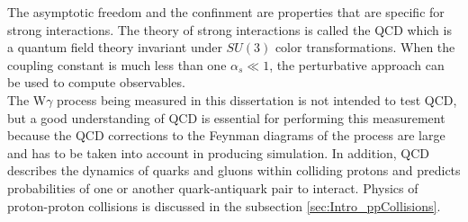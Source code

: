 The asymptotic freedom and the confinment are properties that are specific for strong interactions. The theory of strong interactions is called the QCD which is a quantum field theory invariant under $SU(3)$ color transformations. When the coupling constant is much less than one $\alpha_s \ll 1$, the perturbative approach can be used to compute observables.\\

The W$\gamma$ process being measured in this dissertation is not intended to test QCD, but a good understanding of QCD is essential for performing this measurement because the QCD corrections to the Feynman diagrams of the process are large and has to be taken into account in producing simulation. In addition, QCD describes the dynamics of quarks and gluons within colliding protons and predicts probabilities of one or another quark-antiquark pair to interact. Physics of proton-proton collisions is discussed in the subsection \ref{sec:Intro_ppCollisions}. \\

